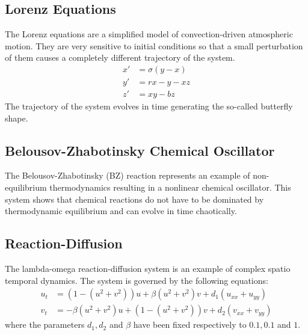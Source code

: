 \documentclass[]{article}
\begin{document}
\subsection{Lorenz Equations}
The Lorenz equations are a simplified model of convection-driven atmospheric motion. They are very sensitive to initial conditions so that a small perturbation of them causes a completely different trajectory of the system.
\begin{equation}
\begin{aligned}
x' &= \sigma (y - x) \\
y' &= rx -y - xz \\
z' &= xy -bz
\end{aligned}
\end{equation}
The trajectory of the system evolves in time generating the so-called butterfly shape.

\subsection{Belousov-Zhabotinsky Chemical Oscillator}
The Belousov-Zhabotinsky (BZ) reaction represents an example of non-equilibrium thermodynamics resulting in a nonlinear chemical oscillator. This system shows that chemical reactions do not have to be dominated by thermodynamic equilibrium and can evolve in time chaotically.

\subsection{Reaction-Diffusion}
The lambda-omega reaction-diffusion system is an example of complex spatio temporal dynamics. The system is governed by the following equations:
\begin{equation}
\begin{aligned}
u_t &= (1-(u^2 +v^2))u+ \beta (u^2 +v^2)v+d_1(u_{xx} +u_{yy}) \\
v_t &=  - \beta (u^2 +v^2)u+(1-(u^2 +v^2))v+d_2(v_{xx} +v_{yy})
\end{aligned}
\end{equation}
where the parameters $d_1, d_2$ and $\beta$ have been fixed respectively to $0.1, 0.1$ and $1$. 
\end{document}
